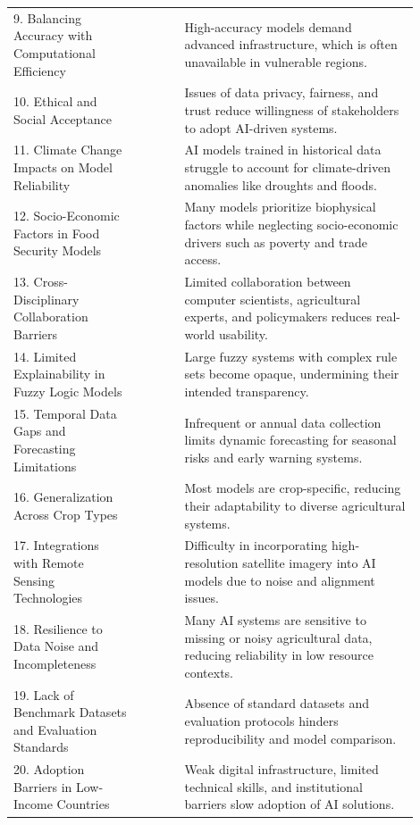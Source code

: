 \documentclass[preprint,12pt]{elsarticle}
\begin{document}
\begin{longtable}{@{}p{0.28\linewidth}p{0.10\linewidth}p{0.52\linewidth}@{}}
		9. Balancing Accuracy with Computational Efficiency & \cite{ref62,ref63} & High-accuracy models demand advanced infrastructure, which is often unavailable in vulnerable regions. \\
		10. Ethical and Social Acceptance & \cite{ref61,ref4} & Issues of data privacy, fairness, and trust reduce willingness of stakeholders to adopt AI-driven systems. \\
		11. Climate Change Impacts on Model Reliability & \cite{ref84} & AI models trained in historical data struggle to account for climate-driven anomalies like droughts and floods. \\
		12. Socio-Economic Factors in Food Security Models & \cite{ref85} & Many models prioritize biophysical factors while neglecting socio-economic drivers such as poverty and trade access. \\
		13. Cross-Disciplinary Collaboration Barriers & \cite{ref86} & Limited collaboration between computer scientists, agricultural experts, and policymakers reduces real-world usability. \\
		14. Limited Explainability in Fuzzy Logic Models & \cite{ref87} & Large fuzzy systems with complex rule sets become opaque, undermining their intended transparency. \\
		15. Temporal Data Gaps and Forecasting Limitations & \cite{ref88} & Infrequent or annual data collection limits dynamic forecasting for seasonal risks and early warning systems. \\
		16. Generalization Across Crop Types & \cite{ref89} & Most models are crop-specific, reducing their adaptability to diverse agricultural systems. \\
		17. Integrations with Remote Sensing Technologies & \cite{ref90} & Difficulty in incorporating high-resolution satellite imagery into AI models due to noise and alignment issues. \\
		18. Resilience to Data Noise and Incompleteness & \cite{ref91} & Many AI systems are sensitive to missing or noisy agricultural data, reducing reliability in low resource contexts. \\
		19. Lack of Benchmark Datasets and Evaluation Standards & \cite{ref92} & Absence of standard datasets and evaluation protocols hinders reproducibility and model comparison. \\
		20. Adoption Barriers in Low-Income Countries & \cite{ref93} & Weak digital infrastructure, limited technical skills, and institutional barriers slow adoption of AI solutions. \\
		\bottomrule
	\end{longtable}
	
\end{document}
